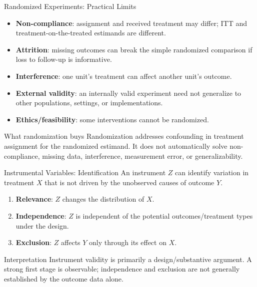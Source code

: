 \documentclass[aspectratio=169,11pt]{beamer}
\begin{document}
\begin{frame}{Randomized Experiments: Practical Limits}
\begin{itemize}
  \item \textbf{Non-compliance}: assignment and received treatment may differ; ITT and treatment-on-the-treated estimands are different.
  \item \textbf{Attrition}: missing outcomes can break the simple randomized comparison if loss to follow-up is informative.
  \item \textbf{Interference}: one unit's treatment can affect another unit's outcome.
  \item \textbf{External validity}: an internally valid experiment need not generalize to other populations, settings, or implementations.
  \item \textbf{Ethics/feasibility}: some interventions cannot be randomized.
\end{itemize}

\begin{alertblock}{What randomization buys}
Randomization addresses confounding in treatment assignment for the randomized estimand. It does not automatically solve non-compliance, missing data, interference, measurement error, or generalizability.
\end{alertblock}
\end{frame}

\begin{frame}{Instrumental Variables: Identification}
An instrument $Z$ can identify variation in treatment $X$ that is not driven by the unobserved causes of outcome $Y$.

\begin{enumerate}
  \item \textbf{Relevance}: $Z$ changes the distribution of $X$.
  \item \textbf{Independence}: $Z$ is independent of the potential outcomes/treatment types under the design.
  \item \textbf{Exclusion}: $Z$ affects $Y$ only through its effect on $X$.
\end{enumerate}

\begin{alertblock}{Interpretation}
Instrument validity is primarily a design/substantive argument. A strong first stage is observable; independence and exclusion are not generally established by the outcome data alone.
\end{alertblock}
\end{frame}
\end{document}
